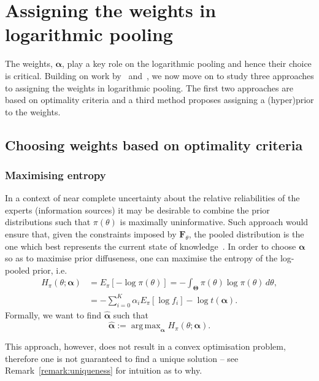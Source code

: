 \documentclass[a4paper, notitlepage, 10pt]{article}
\DeclareMathOperator*{\argmax}{arg\,max}
\begin{document}
\section{Assigning the weights in logarithmic pooling}
\label{sec:weights}

The weights, $\boldsymbol \alpha$, play a key role on the logarithmic pooling and hence their choice is critical.
Building on work by~\cite{Poole2000,Rufo2012A,Rufo2012B} and~\cite{Abbas2009}, we now move on to study three approaches to assigning the weights in logarithmic pooling.
The first two approaches are based on optimality criteria and a third method proposes assigning a (hyper)prior to the weights.

\subsection{Choosing weights based on optimality criteria}

\subsubsection{Maximising entropy}
\label{sec:maxent}

In a context of near complete uncertainty about the relative reliabilities of the experts (information sources) it may be desirable to combine the prior distributions such that $\pi(\theta)$ is maximally uninformative. %
Such approach would ensure that, given the constraints imposed by $\mathbf{F}_{\theta}$, the pooled distribution is the one which best represents the current state of knowledge~\citep{Jaynes1957,Savchuk1994}.
In order to choose $\boldsymbol\alpha$ so as to maximise prior 
diffuseness, one can maximise the entropy of the log-pooled prior, i.e.
\begin{align}
\nonumber
H_{\pi}(\theta; \boldsymbol\alpha) &= E_{\pi}\left[-\log \pi(\theta) \right] =-\int_{\boldsymbol\Theta}\pi(\theta)\log\pi(\theta)\, d\theta,\\
\label{eq:entropypiB}
&= -\sum_{i=0}^{K} \alpha_i E_{\pi}[\log f_i] - \log t(\boldsymbol\alpha).
\end{align}
Formally, we want to find $\hat{\boldsymbol\alpha}$ such that
\begin{equation}
\label{eq:argmaxEnt}
 \hat{\boldsymbol\alpha}:= \argmax_{\boldsymbol\alpha} H_{\pi}(\theta; \boldsymbol\alpha).
\end{equation}

This approach, however, does not result in a convex optimisation problem, therefore one is not guaranteed to find a unique solution -- see Remark~\ref{remark:uniqueness} for intuition as to why.
\end{document}
